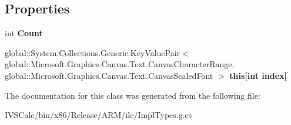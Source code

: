 \subsection*{Properties}
\begin{DoxyCompactItemize}
\item 
\mbox{\label{class_system_1_1_collections_1_1_generic_1_1_i_read_only_list___a___system___collections___gener59f03383ddf862c5034ae163cf6d9cbb_ab889087281c689c3f007e0eb3aa9de02}} 
int {\bfseries Count}
\item 
\mbox{\label{class_system_1_1_collections_1_1_generic_1_1_i_read_only_list___a___system___collections___gener59f03383ddf862c5034ae163cf6d9cbb_a70e25b5465d9ebe34a005796d9e2c10a}} 
global\+::\+System.\+Collections.\+Generic.\+Key\+Value\+Pair$<$ global\+::\+Microsoft.\+Graphics.\+Canvas.\+Text.\+Canvas\+Character\+Range, global\+::\+Microsoft.\+Graphics.\+Canvas.\+Text.\+Canvas\+Scaled\+Font $>$ {\bfseries this\mbox{[}int index\mbox{]}}
\end{DoxyCompactItemize}


The documentation for this class was generated from the following file\+:\begin{DoxyCompactItemize}
\item 
I\+V\+S\+Calc/bin/x86/\+Release/\+A\+R\+M/ilc/Impl\+Types.\+g.\+cs\end{DoxyCompactItemize}
